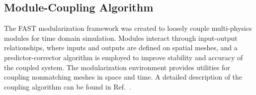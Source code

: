 \documentclass{aiaa-tc}
\begin{document}
 

\subsection{Module-Coupling Algorithm}

The FAST modularization framework was created to loosely couple multi-physics modules for time domain simulation.  
Modules interact through input-output relationships, where inputs and outputs are defined on spatial meshes, and a predictor-corrector algorithm is employed to improve stability and accuracy of the coupled system.    
The modularization environment provides utilities for coupling nonmatching meshes in space and time.
A detailed description of the coupling algorithm can be found in Ref.~\cite{Sprague:2014}.  
\end{document}
